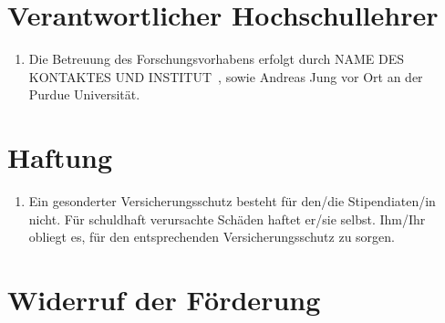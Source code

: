 \documentclass[
  paper=a4,
  fontsize=12pt,
  DIV=16,
  parskip=full,
  headinclude=true,
]{scrartcl}
\newcommand\stipbetreuung{NAME DES KONTAKTES UND INSTITUT}  %
\begin{document}
\section{Verantwortlicher Hochschullehrer}

\begin{enumerate}[\qquad(1)]
  \item Die Betreuung des Forschungsvorhabens erfolgt durch \stipbetreuung\ ,
  sowie Andreas Jung vor Ort an der Purdue Universität.
\end{enumerate}

\section{Haftung}

\begin{enumerate}[\qquad(1)]
  \item Ein gesonderter Versicherungsschutz besteht für den/die
    Stipendiaten/in nicht.
    Für schuldhaft verursachte Schäden haftet er/sie selbst.
    Ihm/Ihr obliegt es, für den entsprechenden Versicherungsschutz
    zu sorgen.
\end{enumerate}

\section{Widerruf der Förderung}
\end{document}
